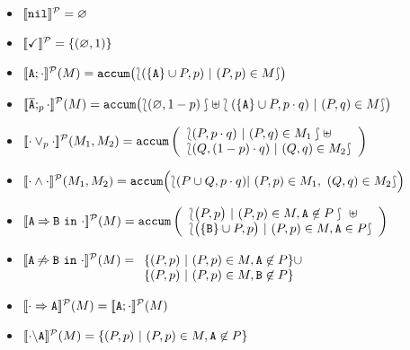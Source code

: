  \begin{itemize}

  \item $[\![\mathtt{nil}]\!]^{\cal P}=\varnothing$

  \item $[\![\checkmark]\!]^{\cal P}=\{(\varnothing,1)\}$

  \item
    $[\![\mathtt{A};\cdot]\!]^{\cal P}(M)=
      \mathtt{accum}\bigl(\lbag(\{\mathtt{A}\}\cup P,p)\ |\ (P,p)\in M\rbag\bigr)
         $

  \item
    $[\![\overline{\mathtt{A}};_{p}\cdot]\!]^{\cal P}(M)=
                \mathtt{accum}\bigl(\lbag(\varnothing , 1-p )\rbag\uplus\lbag (\{\mathtt{A}\}\cup P, p\cdot q ) \ |\ (P,q) \in M\rbag\bigr)$

  \item
    $[\![\cdot\mathbin{\lor}_{p}\cdot]\!]^{\cal P}(M_{1},M_{2})=\mathtt{accum}
    \left(\begin{array}{l}
    \lbag(P,p\cdot q  ) \ |\ (P,q) \in M_{1}\rbag \uplus\\
    \lbag(Q, (1-p)\cdot q  ) \ |\ (Q,q) \in M_{2}\rbag
    \end{array}\right) $
  \item
    $
        [\![\cdot\mathbin{\wedge}\cdot]\!]^{\cal P}(M_{1},M_{2})= \mathtt{accum}\Bigl(
                \lbag (P\cup Q, p\cdot q)  |\ (P,p) \in M_{1},\ (Q,q) \in M_{2}\rbag\Bigr)
    $

  \item
    $[\![\mathtt{A}\mathbin{\Rightarrow}\mathtt{B}\ \mathtt{in}\ \cdot]\!]^{\cal P}(M)=\mathtt{accum}\left(\begin{array}{l}
      \lbag\bigl(P,p\bigr)\ |\  (P,p)\in M, \mathtt{A}\not\in P\rbag\ \uplus\\
      \lbag\bigl(\{\mathtt{B}\}\cup P ,p\bigr)\ |\ (P,p)\in M, \mathtt{A}\in P\rbag \\
      \end{array}\right)$

  \item
    $[\![\mathtt{A}\mathbin{\not\Rightarrow}\mathtt{B}\ \mathtt{in}\ \cdot]\!]^{\cal P}(M)=\begin{array}[t]{l}
      \{(P,p)\ |\ (P,p)\in M, \mathtt{A}\not\in P\}\cup\\
      \{(P,p)\ |\ (P,p)\in M, \mathtt{B}\not\in P\}
      \end{array}$

    \item $[\![\cdot\Rightarrow\mathtt{A}]\!]^{\cal P}(M) = [\![\mathtt{A};{\cdot}]\!]^{\cal P}(M)$

    \item
      $[\![\cdot\backslash\mathtt{A}]\!]^{\cal P}(M) = \{(P,p)\ |\ (P, p) \in M, \mathtt{A}\not\in P      \}$

  \end{itemize}
\edfn


